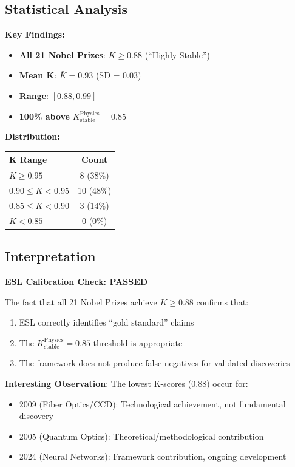 \documentclass[11pt,a4paper]{article}
\begin{document}
\subsection{Statistical Analysis}

\textbf{Key Findings:}
\begin{itemize}
    \item \textbf{All 21 Nobel Prizes}: $K \geq 0.88$ (``Highly Stable'')
    \item \textbf{Mean K}: $\bar{K} = 0.93$ (SD = 0.03)
    \item \textbf{Range}: $[0.88, 0.99]$
    \item \textbf{100\% above} $K_{\text{stable}}^{\text{Physics}} = 0.85$
\end{itemize}

\textbf{Distribution:}
\begin{center}
\begin{tabular}{lc}
\toprule
\textbf{K Range} & \textbf{Count} \\
\midrule
$K \geq 0.95$ & 8 (38\%) \\
$0.90 \leq K < 0.95$ & 10 (48\%) \\
$0.85 \leq K < 0.90$ & 3 (14\%) \\
$K < 0.85$ & 0 (0\%) \\
\bottomrule
\end{tabular}
\end{center}

\subsection{Interpretation}

\textbf{ESL Calibration Check: PASSED}

The fact that all 21 Nobel Prizes achieve $K \geq 0.88$ confirms that:
\begin{enumerate}
    \item ESL correctly identifies ``gold standard'' claims
    \item The $K_{\text{stable}}^{\text{Physics}} = 0.85$ threshold is appropriate
    \item The framework does not produce false negatives for validated discoveries
\end{enumerate}

\textbf{Interesting Observation}: The lowest K-scores (0.88) occur for:
\begin{itemize}
    \item 2009 (Fiber Optics/CCD): Technological achievement, not fundamental discovery
    \item 2005 (Quantum Optics): Theoretical/methodological contribution
    \item 2024 (Neural Networks): Framework contribution, ongoing development
\end{itemize}
\end{document}

